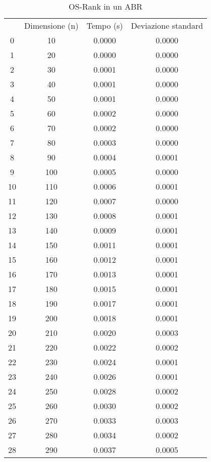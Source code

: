 \begin{table}[H]
\centering
\caption{OS-Rank in un ABR}
\label{OS-Rank in un ABR}
\begin{tabular}{cccc}
 & Dimensione (n) & Tempo (s) & Deviazione standard \\
0 & 10 & 0.0000 & 0.0000 \\
\cline{1-4}
1 & 20 & 0.0000 & 0.0000 \\
\cline{1-4}
2 & 30 & 0.0001 & 0.0000 \\
\cline{1-4}
3 & 40 & 0.0001 & 0.0000 \\
\cline{1-4}
4 & 50 & 0.0001 & 0.0000 \\
\cline{1-4}
5 & 60 & 0.0002 & 0.0000 \\
\cline{1-4}
6 & 70 & 0.0002 & 0.0000 \\
\cline{1-4}
7 & 80 & 0.0003 & 0.0000 \\
\cline{1-4}
8 & 90 & 0.0004 & 0.0001 \\
\cline{1-4}
9 & 100 & 0.0005 & 0.0000 \\
\cline{1-4}
10 & 110 & 0.0006 & 0.0001 \\
\cline{1-4}
11 & 120 & 0.0007 & 0.0000 \\
\cline{1-4}
12 & 130 & 0.0008 & 0.0001 \\
\cline{1-4}
13 & 140 & 0.0009 & 0.0001 \\
\cline{1-4}
14 & 150 & 0.0011 & 0.0001 \\
\cline{1-4}
15 & 160 & 0.0012 & 0.0001 \\
\cline{1-4}
16 & 170 & 0.0013 & 0.0001 \\
\cline{1-4}
17 & 180 & 0.0015 & 0.0001 \\
\cline{1-4}
18 & 190 & 0.0017 & 0.0001 \\
\cline{1-4}
19 & 200 & 0.0018 & 0.0001 \\
\cline{1-4}
20 & 210 & 0.0020 & 0.0003 \\
\cline{1-4}
21 & 220 & 0.0022 & 0.0002 \\
\cline{1-4}
22 & 230 & 0.0024 & 0.0001 \\
\cline{1-4}
23 & 240 & 0.0026 & 0.0001 \\
\cline{1-4}
24 & 250 & 0.0028 & 0.0002 \\
\cline{1-4}
25 & 260 & 0.0030 & 0.0002 \\
\cline{1-4}
26 & 270 & 0.0033 & 0.0003 \\
\cline{1-4}
27 & 280 & 0.0034 & 0.0002 \\
\cline{1-4}
28 & 290 & 0.0037 & 0.0005 \\

\end{tabular}
\end{table}
